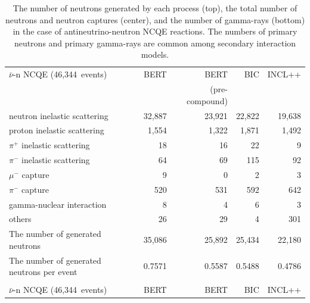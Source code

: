 \begin{table}[h]
	\centering
	\caption[The number of neutrons generated by each process, the total number of neutrons and neutron captures, and the number of gamma-rays in the case of antineutrino-neutron NCQE reactions]{
	The number of neutrons generated by each process (top), the total number of neutrons and neutron captures (center), and the number of gamma-rays (bottom) in the case of antineutrino-neutron NCQE reactions.
	The numbers of primary neutrons and primary gamma-rays are common among secondary interaction models.
	}\label{Others_tab:pre_gamma_nubncqe_n}
	\vs
	\begin{tabular}{lrrrr} \hline \hline
		$\bar{\nu}$-n NCQE (46,344~events)                  &    BERT &           BERT &     BIC &  INCL++ \\
		                                                    &         & (pre-compound) &         &         \\ \hline
		neutron inelastic scattering                        &  32,887 &         23,921 &  22,822 &  19,638 \\
		proton inelastic scattering                         &   1,554 &          1,322 &   1,871 &   1,492 \\
		$\pi^{+}$ inelastic scattering                      &      18 &             16 &      22 &       9 \\
		$\pi^{-}$ inelastic scattering                      &      64 &             69 &     115 &      92 \\
		$\mu^{-}$ capture                                   &       9 &              0 &       2 &       3 \\
		$\pi^{-}$ capture                                   &     520 &            531 &     592 &     642 \\
		gamma-nuclear interaction                           &       8 &              4 &       6 &       3 \\
		others                                              &      26 &             29 &       4 &     301 \\ \hline
		The number of generated neutrons                    &  35,086 &         25,892 &  25,434 &  22,180 \\ \hline
		The number of generated neutrons per event          &  0.7571 &         0.5587 &  0.5488 &  0.4786 \\ \hline \hline
		&&& \\ \hline \hline
		$\bar{\nu}$-n NCQE (46,344~events)                  &    BERT &           BERT &     BIC &  INCL++ \\

\end{tabular}
\end{table}

